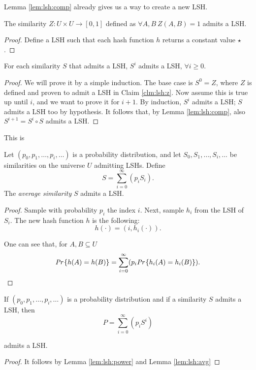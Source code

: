 Lemma \ref{lem:lsh:comp} already gives us a way to create a new LSH.


\begin{claim}\label{clm:lsh:z}
	The similarity $Z:U \times U \rightarrow [0, 1]$ defined as $\forall A, B\ Z(A, B) = 1$ admits a LSH.
\end{claim}
\begin{proof}
	Define a LSH such that each hash function $h$ returns a constant value $\star$.
\end{proof}

\begin{lem}\label{lem:lsh:power}
	For each similarity $S$ that admits a LSH, $S^i$ admits a LSH, $\forall i \geq 0$.
\end{lem}
\begin{proof}
	We will prove it by a simple induction. The base case is $S^0 = Z$, where $Z$ is defined and proven to admit a LSH in Claim \ref{clm:lsh:z}. Now assume this is true up until $i$, and we want to prove it for $i + 1$. By induction, $S^i$ admits a LSH; $S$ admits a LSH too by hypothesis. It follows that, by Lemma \ref{lem:lsh:comp}, also $S^{i+1} = S^i\circ S$ admits a LSH.
\end{proof}

This is 

\begin{lem}\label{lem:lsh:avg}
	Let $(p_0, p_1, \ldots, p_i, \ldots)$ is a probability distribution, and let $S_0, S_1, \ldots, S_i, \ldots$ be similarities on the universe $U$ admitting LSHs. Define
	\begin{equation}
		S = \sum_{i=0}^\infty (p_iS_i).
	\end{equation}
	The \emph{average similarity} $S$ admits a LSH.
\end{lem}
\begin{proof}
	Sample with probability $p_i$ the index $i$. Next, sample $h_i$ from the LSH of $S_i$. The new hash function $h$ is the following:
	\begin{equation}
		h(\cdot) = (i, h_i(\cdot)).
	\end{equation}
	
	One can see that, for $A, B \subseteq U$
	\begin{equation}
		\emph{Pr}\left\{h(A) = h(B)\right\} = \sum_{i=0}^\infty (p_i \emph{Pr}\left\{h_i(A) = h_i(B)\right\}).
	\end{equation}
\end{proof}

\begin{thm}\label{thm:lsh:thm1}
	If $(p_0, p_1, \ldots, p_i, \ldots)$ is a probability distribution and if a similarity $S$ admits a LSH, then 
	\begin{equation}
		P = \sum_{i=0}^\infty (p_iS^i)
	\end{equation}
	
	admits a LSH.
\end{thm}
\begin{proof}
	It follows by Lemma \ref{lem:lsh:power} and Lemma \ref{lem:lsh:avg}
\end{proof}

